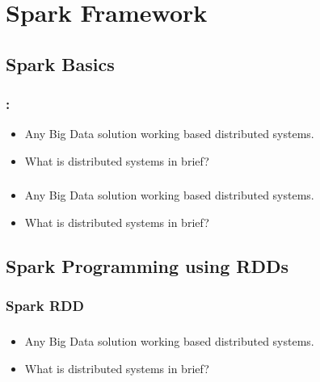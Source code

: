 \section{Spark Framework}
\subsection{Spark Basics}


\begin{frame}
  \frametitle{\secname : \subsecname}
	\begin{itemize}[<+->]
		\item Any Big Data solution working based distributed systems.
		\item What is distributed systems in brief?
	\end{itemize}
\end{frame}

\begin{frame}
  \frametitle{\subsecname}
	\begin{itemize}[<+->]
		\item Any Big Data solution working based distributed systems.
		\item What is distributed systems in brief?
	\end{itemize}
\end{frame}

\subsection{Spark Programming using RDDs}
\subsubsection{Spark RDD}

\begin{frame}
  \frametitle{\subsecname}
	\begin{itemize}[<+->]
		\item Any Big Data solution working based distributed systems.
		\item What is distributed systems in brief?
	\end{itemize}
\end{frame}

